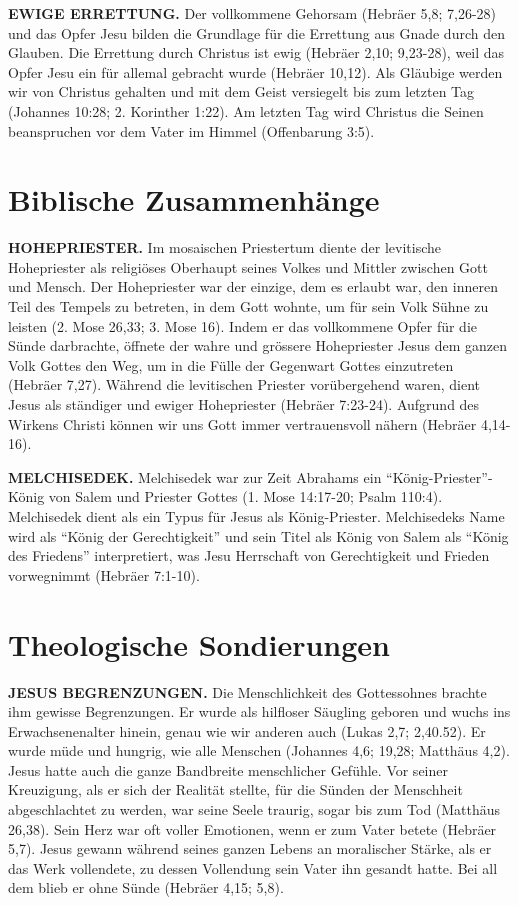 \documentclass[]{krantz}
\begin{document}
\textbf{EWIGE ERRETTUNG.} Der vollkommene Gehorsam (Hebräer 5,8;
7,26-28) und das Opfer Jesu bilden die Grundlage für die Errettung aus
Gnade durch den Glauben. Die Errettung durch Christus ist ewig (Hebräer
2,10; 9,23-28), weil das Opfer Jesu ein für allemal gebracht wurde
(Hebräer 10,12). Als Gläubige werden wir von Christus gehalten und mit
dem Geist versiegelt bis zum letzten Tag (Johannes 10:28; 2. Korinther
1:22). Am letzten Tag wird Christus die Seinen beanspruchen vor dem
Vater im Himmel (Offenbarung 3:5).

\section{Biblische Zusammenhänge}\label{biblische-zusammenhuxe4nge-3}

\textbf{HOHEPRIESTER.} Im mosaischen Priestertum diente der levitische
Hohepriester als religiöses Oberhaupt seines Volkes und Mittler zwischen
Gott und Mensch. Der Hohepriester war der einzige, dem es erlaubt war,
den inneren Teil des Tempels zu betreten, in dem Gott wohnte, um für
sein Volk Sühne zu leisten (2. Mose 26,33; 3. Mose 16). Indem er das
vollkommene Opfer für die Sünde darbrachte, öffnete der wahre und
grössere Hohepriester Jesus dem ganzen Volk Gottes den Weg, um in die
Fülle der Gegenwart Gottes einzutreten (Hebräer 7,27). Während die
levitischen Priester vorübergehend waren, dient Jesus als ständiger und
ewiger Hohepriester (Hebräer 7:23-24). Aufgrund des Wirkens Christi
können wir uns Gott immer vertrauensvoll nähern (Hebräer 4,14-16).

\textbf{MELCHISEDEK.} Melchisedek war zur Zeit Abrahams ein
``König-Priester''-König von Salem und Priester Gottes (1. Mose
14:17-20; Psalm 110:4). Melchisedek dient als ein Typus für Jesus als
König-Priester. Melchisedeks Name wird als ``König der Gerechtigkeit''
und sein Titel als König von Salem als ``König des Friedens''
interpretiert, was Jesu Herrschaft von Gerechtigkeit und Frieden
vorwegnimmt (Hebräer 7:1-10).

\section{Theologische Sondierungen}\label{theologische-sondierungen-1}

\textbf{JESUS BEGRENZUNGEN.} Die Menschlichkeit des Gottessohnes brachte
ihm gewisse Begrenzungen. Er wurde als hilfloser Säugling geboren und
wuchs ins Erwachsenenalter hinein, genau wie wir anderen auch (Lukas
2,7; 2,40.52). Er wurde müde und hungrig, wie alle Menschen (Johannes
4,6; 19,28; Matthäus 4,2). Jesus hatte auch die ganze Bandbreite
menschlicher Gefühle. Vor seiner Kreuzigung, als er sich der Realität
stellte, für die Sünden der Menschheit abgeschlachtet zu werden, war
seine Seele traurig, sogar bis zum Tod (Matthäus 26,38). Sein Herz war
oft voller Emotionen, wenn er zum Vater betete (Hebräer 5,7). Jesus
gewann während seines ganzen Lebens an moralischer Stärke, als er das
Werk vollendete, zu dessen Vollendung sein Vater ihn gesandt hatte. Bei
all dem blieb er ohne Sünde (Hebräer 4,15; 5,8).
\end{document}
